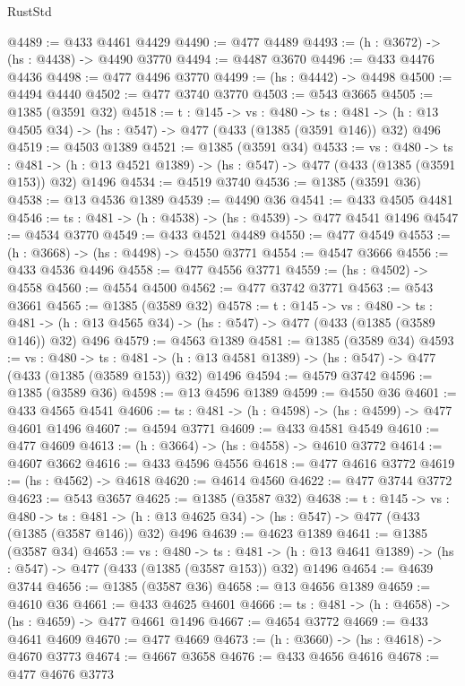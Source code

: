 \begin{lexlean}{RustStd}
\begin{coremodule}
{\begin{coremodule}
{{{{{{{{{{{{{{{{@4489 := @433 @4461 @4429
@4490 := @477 @4489
@4493 := (h : @3672) -> (hs : @4438) -> @4490 @3770
@4494 := @4487 @3670
@4496 := @433 @4476 @4436
@4498 := @477 @4496 @3770
@4499 := (hs : @4442) -> @4498
@4500 := @4494 @4440
@4502 := @477 @3740 @3770
@4503 := @543 @3665
@4505 := @1385 (@3591 @32)
@4518 := {t : @145} ->
  {vs : @480} ->
  {ts : @481} -> (h : @13 @4505 @34) -> (hs : @547) -> @477 (@433 (@1385 (@3591 @146)) @32) @496
@4519 := @4503 @1389
@4521 := @1385 (@3591 @34)
@4533 := {vs : @480} ->
  {ts : @481} -> (h : @13 @4521 @1389) -> (hs : @547) -> @477 (@433 (@1385 (@3591 @153)) @32) @1496
@4534 := @4519 @3740
@4536 := @1385 (@3591 @36)
@4538 := @13 @4536 @1389
@4539 := @4490 @36
@4541 := @433 @4505 @4481
@4546 := {ts : @481} -> (h : @4538) -> (hs : @4539) -> @477 @4541 @1496
@4547 := @4534 @3770
@4549 := @433 @4521 @4489
@4550 := @477 @4549
@4553 := (h : @3668) -> (hs : @4498) -> @4550 @3771
@4554 := @4547 @3666
@4556 := @433 @4536 @4496
@4558 := @477 @4556 @3771
@4559 := (hs : @4502) -> @4558
@4560 := @4554 @4500
@4562 := @477 @3742 @3771
@4563 := @543 @3661
@4565 := @1385 (@3589 @32)
@4578 := {t : @145} ->
  {vs : @480} ->
  {ts : @481} -> (h : @13 @4565 @34) -> (hs : @547) -> @477 (@433 (@1385 (@3589 @146)) @32) @496
@4579 := @4563 @1389
@4581 := @1385 (@3589 @34)
@4593 := {vs : @480} ->
  {ts : @481} -> (h : @13 @4581 @1389) -> (hs : @547) -> @477 (@433 (@1385 (@3589 @153)) @32) @1496
@4594 := @4579 @3742
@4596 := @1385 (@3589 @36)
@4598 := @13 @4596 @1389
@4599 := @4550 @36
@4601 := @433 @4565 @4541
@4606 := {ts : @481} -> (h : @4598) -> (hs : @4599) -> @477 @4601 @1496
@4607 := @4594 @3771
@4609 := @433 @4581 @4549
@4610 := @477 @4609
@4613 := (h : @3664) -> (hs : @4558) -> @4610 @3772
@4614 := @4607 @3662
@4616 := @433 @4596 @4556
@4618 := @477 @4616 @3772
@4619 := (hs : @4562) -> @4618
@4620 := @4614 @4560
@4622 := @477 @3744 @3772
@4623 := @543 @3657
@4625 := @1385 (@3587 @32)
@4638 := {t : @145} ->
  {vs : @480} ->
  {ts : @481} -> (h : @13 @4625 @34) -> (hs : @547) -> @477 (@433 (@1385 (@3587 @146)) @32) @496
@4639 := @4623 @1389
@4641 := @1385 (@3587 @34)
@4653 := {vs : @480} ->
  {ts : @481} -> (h : @13 @4641 @1389) -> (hs : @547) -> @477 (@433 (@1385 (@3587 @153)) @32) @1496
@4654 := @4639 @3744
@4656 := @1385 (@3587 @36)
@4658 := @13 @4656 @1389
@4659 := @4610 @36
@4661 := @433 @4625 @4601
@4666 := {ts : @481} -> (h : @4658) -> (hs : @4659) -> @477 @4661 @1496
@4667 := @4654 @3772
@4669 := @433 @4641 @4609
@4670 := @477 @4669
@4673 := (h : @3660) -> (hs : @4618) -> @4670 @3773
@4674 := @4667 @3658
@4676 := @433 @4656 @4616
@4678 := @477 @4676 @3773
}}}}}}}}}}}}}}}}
\end{coremodule}}
\end{coremodule}
\end{lexlean}
